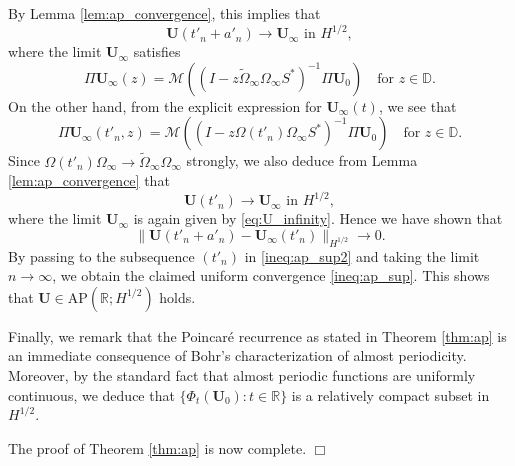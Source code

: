 \documentclass[10pt,reqno,a4paper]{amsart}
\theoremstyle{definition}
\theoremstyle{remark}
\theoremstyle{remark}
\numberwithin{equation}{section}
\newcommand{\AP}{\mathrm{AP}}
\newcommand{\R}{\mathbb{R}}
\newcommand{\D}{\mathbb{D}}
\newcommand{\Mean}{\mathscr{M}}
\newcommand{\be}{\begin{equation}}
\newcommand{\ee}{\end{equation}}
\newcommand{\Ub}{\mathbf{U}}
\newcommand{\id}{I}
\newcommand{\Om}{\Omega}
\begin{document}
By Lemma \ref{lem:ap_convergence}, this implies that 
$$
\mbox{$\Ub(t'_n + a'_n) \to \Ub_\infty$ in $H^{1/2}$},
$$
where the limit $\Ub_\infty$ satisfies
\be \label{eq:U_infinity}
\Pi \Ub_\infty(z) = \Mean((\id- z \widetilde{\Om}_\infty \Om_\infty S^*)^{-1} \Pi \Ub_0) \quad \mbox{for $z \in \D$}.
\ee
On the other hand, from the explicit expression for $\Ub_\infty(t)$, we see that
$$
\Pi \Ub_\infty(t'_n,z) = \Mean ((\id-z \Om(t'_n) \Om_\infty S^*)^{-1} \Pi \Ub_0) \quad \mbox{for $z \in \D$}.
$$
Since $\Om(t'_n) \Om_\infty \to \widetilde{\Om}_\infty \Om_\infty$ strongly, we also deduce from Lemma \ref{lem:ap_convergence}  that 
$$
\mbox{$\Ub(t'_n) \to \Ub_\infty$ in $H^{1/2}$},
$$ 
where the limit $\Ub_\infty$ is again given by \eqref{eq:U_infinity}. Hence we have shown that
$$
 \| \Ub(t'_n+a'_n) - \Ub_\infty(t'_n) \|_{H^{1/2}} \to 0.
$$
By passing to the subsequence $(t'_n)$ in \eqref{ineq:ap_sup2} and taking the limit $n \to \infty$, we obtain the claimed uniform convergence \eqref{ineq:ap_sup}. This shows that $\Ub \in \AP(\R; H^{1/2})$ holds.

Finally, we remark that the Poincar\'e recurrence as stated in Theorem \ref{thm:ap} is an immediate consequence of Bohr's characterization of almost periodicity. Moreover, by the standard fact that almost periodic functions are uniformly continuous, we deduce that $\{ \Phi_t(\Ub_0) : t \in \R \}$ is a relatively compact subset in $H^{1/2}$.

The proof of Theorem \ref{thm:ap} is now complete. \hfill $\Box$
\end{document}
